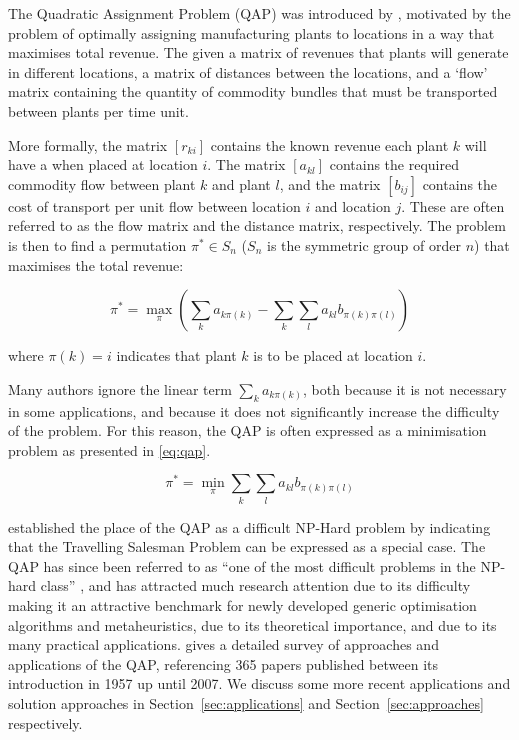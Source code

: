 
%

The Quadratic Assignment Problem (QAP) was introduced by \citet{Koopmans:1957gf}, motivated by the problem of optimally assigning manufacturing plants to locations in a way that maximises total revenue.
The given a matrix of revenues that plants will generate in different locations, a matrix of distances between the locations, and a `flow' matrix containing the quantity of commodity bundles that must be transported between plants per time unit.

More formally, the matrix \([r_{ki}]\) contains the known revenue each plant \(k\) will have a when placed at location \(i\).
The matrix \([a_{kl}]\) contains the required commodity flow between plant \(k\) and plant \(l\), and the matrix \([b_{ij}]\) contains the cost of transport per unit flow between location \(i\) and location \(j\). These are often referred to as the flow matrix and the distance matrix, respectively.
The problem is then to find a permutation \(\pi^{*} \in S_n\) (\(S_n\) is the symmetric group of order \(n\)) that maximises the total revenue:

\[ \pi^{*} = \max_{\pi} \left(\sum_{k}{a_{k\pi(k)}} - \sum_{k}\sum_{l}{a_{kl}b_{\pi(k)\pi(l)}}\right) \]

where  \(\pi(k) = i\) indicates that plant \(k\) is to be placed at location \(i\).

Many authors ignore the linear term \(\sum_{k}{a_{k\pi(k)}}\), both because it is not necessary in some applications, and because it does not significantly increase the difficulty of the problem. For this reason, the QAP is often expressed as a minimisation problem as presented in \eqref{eq:qap}.

\begin{equation}
    \label{eq:qap}
    \pi^{*} = \min_{\pi} \sum_{k}\sum_{l}{a_{kl}b_{\pi(k)\pi(l)}}
\end{equation}

\citeauthor{Koopmans:1957gf} established the place of the QAP as a difficult NP-Hard problem by indicating that the Travelling Salesman Problem can be expressed as a special case. The QAP has since been referred to as ``one of the most difficult problems in the NP-hard class'' \citep{Loiola:2007jk}, and has attracted much research attention due to its difficulty making it an attractive benchmark for newly developed generic optimisation algorithms and metaheuristics, due to its theoretical importance, and due to its many practical applications.
\citet{Loiola:2007jk} gives a detailed survey of approaches and applications of the QAP, referencing 365 papers published between its introduction in 1957 up until 2007. We discuss some more recent applications and solution approaches in Section~\ref{sec:applications} and Section~\ref{sec:approaches} respectively.

